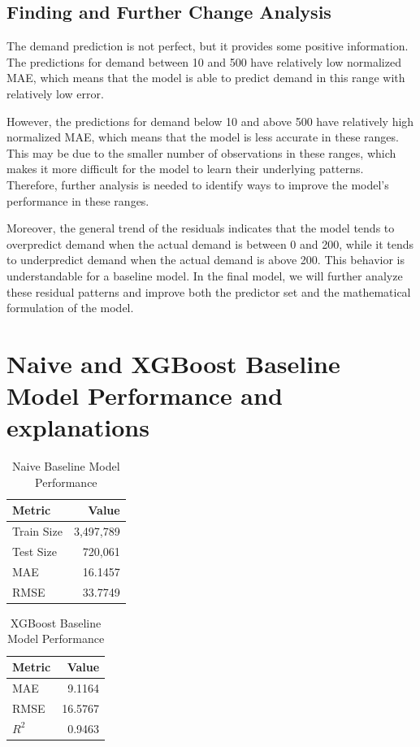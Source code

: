 \documentclass{article}
\begin{document}
\subsection{Finding and Further Change Analysis}


The demand prediction is not perfect, but it provides some positive 
information. The predictions for demand between 10 and 500 have relatively 
low normalized MAE, which means that the model is able to predict demand 
in this range with relatively low error.

However, the predictions for demand below 10 and above 500 have relatively 
high normalized MAE, which means that the model is less accurate in these 
ranges. This may be due to the smaller number of observations in these 
ranges, which makes it more difficult for the model to learn their underlying 
patterns. Therefore, further analysis is needed to identify ways to improve 
the model's performance in these ranges.

Moreover, the general trend of the residuals indicates that the model tends 
to overpredict demand when the actual demand is between 0 and 200, while it 
tends to underpredict demand when the actual demand is above 200. This behavior 
is understandable for a baseline model. In the final model, we will further 
analyze these residual patterns and improve both the predictor set and the 
mathematical formulation of the model.


\section{Naive and XGBoost Baseline Model Performance and explanations}

\begin{table}[htbp]
\centering
\caption{Naive Baseline Model Performance}
\begin{tabular}{lr}
\hline
Metric & Value \\
\hline
Train Size & 3,497,789 \\
Test Size  & 720,061 \\
MAE        & 16.1457 \\
RMSE       & 33.7749 \\
\hline
\end{tabular}
\end{table}

\begin{table}[htbp]
\centering
\caption{XGBoost Baseline Model Performance}
\begin{tabular}{lr}
\hline
Metric & Value \\
\hline
MAE        & 9.1164 \\
RMSE       & 16.5767 \\
$R^2$      & 0.9463 \\
\hline
\end{tabular}
\end{table}
\end{document}
